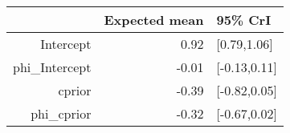 \begin{tabular}{rrl}
  \hline
 & Expected mean & 95\% CrI \\ 
  \hline
Intercept & 0.92 & [0.79,1.06] \\ 
  phi\_Intercept & -0.01 & [-0.13,0.11] \\ 
  cprior & -0.39 & [-0.82,0.05] \\ 
  phi\_cprior & -0.32 & [-0.67,0.02] \\ 
   \hline
\end{tabular}

